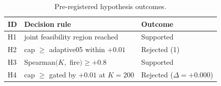 \begin{table}[!t]
  \caption{Pre-registered hypothesis outcomes.}
  \label{tab:hypotheses}
  \centering
  \small
  \setlength{\tabcolsep}{4pt}
  \begin{tabular}{@{}p{0.5cm}p{4.7cm}p{2.1cm}@{}}
    \toprule
    \textbf{ID} & \textbf{Decision rule} & \textbf{Outcome} \\
    \midrule
    H1 & joint feasibility region reached & Supported \\
    H2 & cap $\geq$ adaptive05 within $+0.01$ & Rejected (1) \\
    H3 & Spearman$(K,$ fire$)\geq +0.8$ & Supported \\
    H4 & cap $\geq$ gated by $+0.01$ at $K=200$ & Rejected ($\Delta=+0.000$) \\
    \bottomrule
  \end{tabular}
\end{table}
